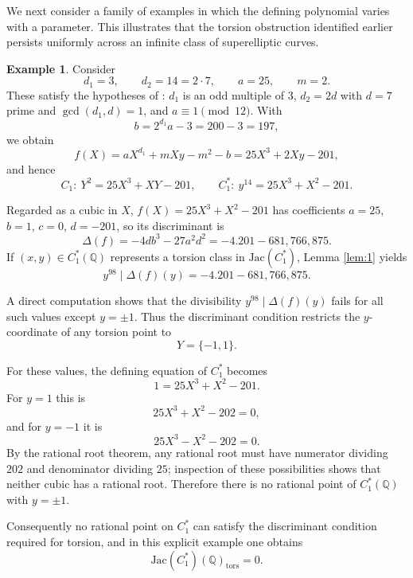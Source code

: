 \documentclass[12pt, reqno]{amsart}
\numberwithin{equation}{section}
\theoremstyle{definition}
\newtheorem{example}[thm]{Example}
\theoremstyle{nodefstyle}
\begin{document}
We next consider a family of examples in which the defining polynomial varies with a
parameter. This illustrates that the torsion obstruction identified earlier persists
uniformly across an infinite class of superelliptic curves.
\begin{example}\label{ex:torsion-2}
Consider
\[
d_1 = 3,\qquad d_2 = 14 = 2\cdot 7,\qquad a = 25,\qquad m = 2.
\]
These satisfy the hypotheses of : \(d_1\) is an odd multiple of \(3\), \(d_2 = 2d\) with \(d=7\) prime and \(\gcd(d_1,d)=1\), and \(a \equiv 1 \pmod{12}\).  
With
\[
b = 2^{d_1} a - 3 = 200 - 3 = 197,
\]
we obtain
\[
f(X) = aX^{d_1} + mXy - m^2 - b = 25X^3 + 2Xy - 201,
\]
and hence
\[
C_1:\ Y^2 = 25X^3 + XY - 201,\qquad
C_1^*:\ y^{14} = 25X^3 + X^2 - 201.
\]

Regarded as a cubic in \(X\), \(f(X) = 25X^3 + X^2 - 201\) has coefficients \(a=25\), \(b=1\), \(c=0\), \(d=-201\), so its discriminant is
\[
\Delta(f) = -4db^3 - 27a^2 d^2 = -4.201 - 681{,}766{,}875.
\]
If \((x,y)\in C_1^*(\mathbb{Q})\) represents a torsion class in \(\mathrm{Jac}(C_1^*)\), Lemma \autoref{lem:1} yields
\[
y^{98} \mid \Delta(f)(y) = -4.201 - 681{,}766{,}875.
\]

A direct computation shows that the divisibility \(y^{98}\mid \Delta(f)(y)\) fails for all such values except \(y=\pm 1\). Thus the discriminant condition restricts the \(y\)-coordinate of any torsion point to
\[
Y = \{-1,1\}.
\]

For these values, the defining equation of \(C_1^*\) becomes
\[
1 = 25X^3 + X^2 - 201.
\]
For \(y = 1\) this is
\[
25X^3 + X^2 - 202 = 0,
\]
and for \(y = -1\) it is
\[
25X^3 - X^2 - 202 = 0.
\]
By the rational root theorem, any rational root must have numerator dividing \(202\) and denominator dividing \(25\); inspection of these possibilities shows that neither cubic has a rational root. Therefore there is no rational point of \(C_1^*(\mathbb{Q})\) with \(y = \pm 1\).

Consequently no rational point on \(C_1^*\) can satisfy the discriminant condition required for torsion, and in this explicit example one obtains
\[
\mathrm{Jac}(C_1^*)(\mathbb{Q})_{\mathrm{tors}} = 0.
\]
\end{example}

\end{document}
